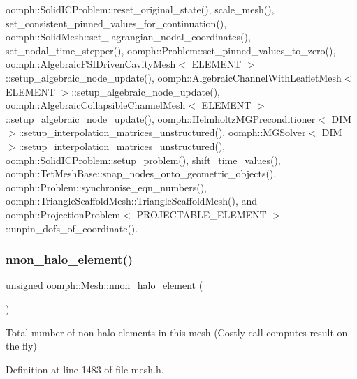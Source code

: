 oomph\+::\+Solid\+I\+C\+Problem\+::reset\+\_\+original\+\_\+state(), scale\+\_\+mesh(), set\+\_\+consistent\+\_\+pinned\+\_\+values\+\_\+for\+\_\+continuation(), oomph\+::\+Solid\+Mesh\+::set\+\_\+lagrangian\+\_\+nodal\+\_\+coordinates(), set\+\_\+nodal\+\_\+time\+\_\+stepper(), oomph\+::\+Problem\+::set\+\_\+pinned\+\_\+values\+\_\+to\+\_\+zero(), oomph\+::\+Algebraic\+F\+S\+I\+Driven\+Cavity\+Mesh$<$ E\+L\+E\+M\+E\+N\+T $>$\+::setup\+\_\+algebraic\+\_\+node\+\_\+update(), oomph\+::\+Algebraic\+Channel\+With\+Leaflet\+Mesh$<$ E\+L\+E\+M\+E\+N\+T $>$\+::setup\+\_\+algebraic\+\_\+node\+\_\+update(), oomph\+::\+Algebraic\+Collapsible\+Channel\+Mesh$<$ E\+L\+E\+M\+E\+N\+T $>$\+::setup\+\_\+algebraic\+\_\+node\+\_\+update(), oomph\+::\+Helmholtz\+M\+G\+Preconditioner$<$ D\+I\+M $>$\+::setup\+\_\+interpolation\+\_\+matrices\+\_\+unstructured(), oomph\+::\+M\+G\+Solver$<$ D\+I\+M $>$\+::setup\+\_\+interpolation\+\_\+matrices\+\_\+unstructured(), oomph\+::\+Solid\+I\+C\+Problem\+::setup\+\_\+problem(), shift\+\_\+time\+\_\+values(), oomph\+::\+Tet\+Mesh\+Base\+::snap\+\_\+nodes\+\_\+onto\+\_\+geometric\+\_\+objects(), oomph\+::\+Problem\+::synchronise\+\_\+eqn\+\_\+numbers(), oomph\+::\+Triangle\+Scaffold\+Mesh\+::\+Triangle\+Scaffold\+Mesh(), and oomph\+::\+Projection\+Problem$<$ P\+R\+O\+J\+E\+C\+T\+A\+B\+L\+E\+\_\+\+E\+L\+E\+M\+E\+N\+T $>$\+::unpin\+\_\+dofs\+\_\+of\+\_\+coordinate().

\mbox{\label{classoomph_1_1Mesh_a9e74e01173bbdf890d0ea1908b22b6ef}} 
\subsubsection{\texorpdfstring{nnon\+\_\+halo\+\_\+element()}{nnon\_halo\_element()}}
{\footnotesize\ttfamily unsigned oomph\+::\+Mesh\+::nnon\+\_\+halo\+\_\+element (\begin{DoxyParamCaption}{ }\end{DoxyParamCaption})\hspace{0.3cm}{\ttfamily [inline]}}



Total number of non-\/halo elements in this mesh (Costly call computes result on the fly) 



Definition at line 1483 of file mesh.\+h.



